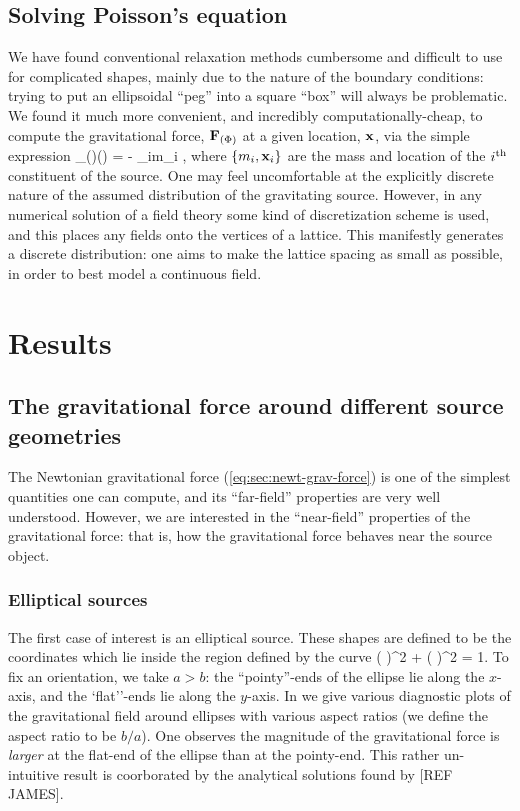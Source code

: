 \documentclass[amsmath,amssymb,12pt,eqsecnum]{revtex4}
\begin{document}
\subsection{Solving Poisson's equation}
We have found conventional relaxation methods cumbersome and difficult to use for complicated shapes, mainly due to the nature of the boundary conditions: trying to put an ellipsoidal ``peg'' into a square ``box'' will always be problematic. We found it much more convenient, and incredibly computationally-cheap, to compute  the gravitational force, ${\bf{F}}_{(\Phi)}$ at a given location, ${\bf{x}}$, via the simple expression
\bea
\label{eq:sec:newt-grav-force}
_{(\Phi)}() = - \sum_{i}m_i ,
\eea
where $\{m_i,{\bf{x}}_i\}$ are the mass and location of the ${i}^{\scriptsize{\textrm{th}}}$ constituent of the source. One may feel uncomfortable at the explicitly discrete nature of the assumed distribution of the gravitating source. However, in any numerical solution of a field theory some kind of discretization scheme is used, and this places any fields onto the vertices of a lattice. This manifestly generates a discrete distribution: one aims to make the lattice spacing as small as possible, in order to best model a continuous field.



\section{Results}

\subsection{The gravitational force around different source geometries}
The Newtonian gravitational force (\ref{eq:sec:newt-grav-force}) is one of the simplest quantities one can compute, and its ``far-field'' properties are very well understood. However, we are interested in the ``near-field'' properties of the gravitational force: that is, how the gravitational force behaves near the source object.

\subsubsection{Elliptical sources}
The first case of interest is an elliptical source. These shapes are defined to be the coordinates which lie inside the region defined by the curve
\bea
\left( \right)^2 + \left( \right)^2 = 1.
\eea
To fix an orientation, we take $a > b$: the ``pointy''-ends of the ellipse lie along the $x$-axis, and the `flat''-ends lie along the $y$-axis. In  we give various diagnostic plots of the gravitational field around ellipses with various aspect ratios (we define the aspect ratio to be $b/a$). One observes the magnitude of the gravitational force is \textit{larger} at the flat-end of the ellipse than at the pointy-end. This rather un-intuitive result is coorborated by the analytical solutions found by [REF JAMES]. 
\end{document}
